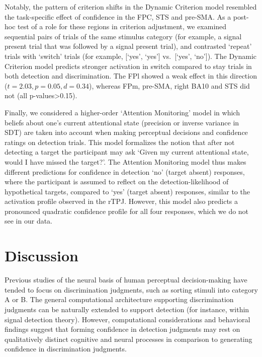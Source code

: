 \documentclass[12pt,twoside]{reedthesis}
\begin{document}
Notably, the pattern of criterion shifts in the Dynamic Criterion model resembled the task-specific effect of confidence in the FPC, STS and pre-SMA. As a post-hoc test of a role for these regions in criterion adjustment, we examined sequential pairs of trials of the same stimulus category (for example, a signal present trial that was followed by a signal present trial), and contrasted `repeat' trials with `switch' trials (for example, {[}`yes', `yes'{]} vs.~{[}`yes', `no'{]}). The Dynamic Criterion model predicts stronger activation in switch compared to stay trials in both detection and discrimination. The FPl showed a weak effect in this direction (\(t = 2.03, p=0.05, d = 0.34\)), whereas FPm, pre-SMA, right BA10 and STS did not (all p-values\textgreater0.15).

Finally, we considered a higher-order `Attention Monitoring' model in which beliefs about one's current attentional state (precision or inverse variance in SDT) are taken into account when making perceptual decisions and confidence ratings on detection trials. This model formalizes the notion that after not detecting a target the participant may ask `Given my current attentional state, would I have missed the target?'. The Attention Monitoring model thus makes different predictions for confidence in detection `no' (target absent) responses, where the participant is assumed to reflect on the detection-likelihood of hypothetical targets, compared to `yes' (target absent) responses, similar to the activation profile observed in the rTPJ. However, this model also predicts a pronounced quadratic confidence profile for all four responses, which we do not see in our data.

\hypertarget{discussion-1}{%
\section{Discussion}\label{discussion-1}}

Previous studies of the neural basis of human perceptual decision-making have tended to focus on discrimination judgments, such as sorting stimuli into category A or B. The general computational architecture supporting discrimination judgments can be naturally extended to support detection (for instance, within signal detection theory). However, computational considerations and behavioral findings suggest that forming confidence in detection judgments may rest on qualitatively distinct cognitive and neural processes in comparison to generating confidence in discrimination judgments.
\end{document}
